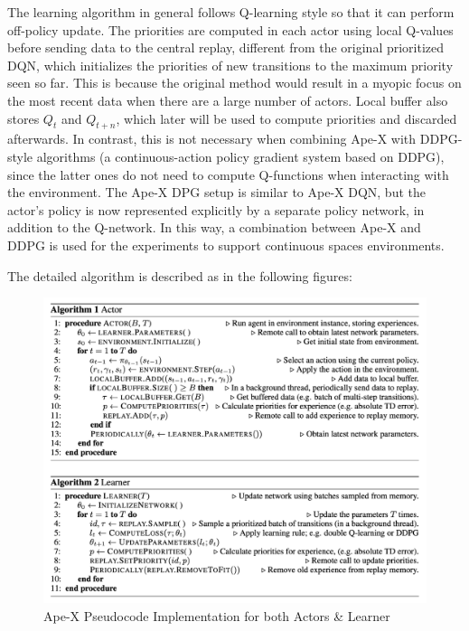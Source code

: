 The learning algorithm in general follows Q-learning style so that it can perform off-policy update. 
The priorities are computed in each actor using local Q-values before sending data to the central replay, different from the original prioritized DQN, which initializes the priorities of new transitions to the maximum priority seen so far. This is because the original method would result in a myopic focus on the most recent data when there are a large number of actors. Local buffer also stores \(Q_{t}\) and \(Q_{t+n}\), which later will be used to compute priorities and discarded afterwards. In contrast, this is not necessary when combining Ape-X with DDPG-style algorithms (a continuous-action policy gradient system based on DDPG), since the latter ones do not need to compute Q-functions when interacting with the environment. The Ape-X DPG setup is similar to Ape-X DQN, but the actor’s policy is now represented explicitly by a separate policy network, in addition to the Q-network.
In this way, a combination between Ape-X and DDPG is used for the experiments to support continuous spaces environments.

The detailed algorithm is described as in the following figures:
\begin{figure}[!htb]
		\centering
		\includegraphics[width=\linewidth]{figures/apex.png}
		\caption{Ape-X Pseudocode Implementation for both Actors \& Learner}
		\label{fig:apex_algorithm}
\end{figure}